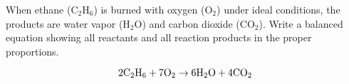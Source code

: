 

When ethane (C$_{2}$H$_{6}$) is burned with oxygen (O$_{2}$) under ideal conditions, the products are water vapor (H$_{2}$O) and carbon dioxide (CO$_{2}$).  Write a balanced equation showing all reactants and all reaction products in the proper proportions.







$$\hbox{2C}_2\hbox{H}_6 + \hbox{7O}_2 \to \hbox{6H}_2\hbox{O} + \hbox{4CO}_2$$











